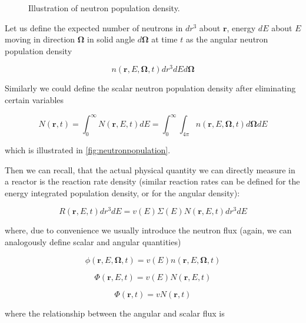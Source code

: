 \begin{figure}[ht!]
\protect {}\protect
\caption{\label{fig:neutronpopulation} \footnotesize{Illustration of neutron population density.}}
\end{figure} 

Let us define the expected number of neutrons in $dr^3$ about $\mathbf{r}$, energy $dE$ about $E$ moving in direction $\mathbf{\Omega}$ in solid angle $d\mathbf{\Omega}$ at time $t$ as the angular neutron population density

\begin{equation}
n(\mathbf{r},E,\mathbf{\Omega},t)dr^3dEd\mathbf{\Omega}
\end{equation}

\noindent Similarly we could define the scalar neutron population density after eliminating certain variables 

$$N(\mathbf{r},t)=\int^\infty_0N(\mathbf{r},E,t)dE=\int^\infty_0\int_{4\pi}n(\mathbf{r},E,\mathbf{\Omega},t)d\mathbf{\Omega}dE$$

\noindent which is illustrated in \autoref{fig:neutronpopulation}.

Then we can recall, that the actual physical quantity we can directly measure in a reactor is the reaction rate density (similar reaction rates can be defined for the energy integrated population density, or for the angular density):

\begin{equation}
R(\mathbf{r},E,t)dr^3dE=v(E)\Sigma(E) N(\mathbf{r},E,t)dr^3dE
\end{equation}

\noindent where, due to convenience we usually introduce the neutron flux (again, we can analogously define scalar and angular quantities)

\begin{equation}
\phi(\mathbf{r},E,\mathbf{\Omega},t)=v(E)n(\mathbf{r},E,\mathbf{\Omega},t)
\end{equation}

\begin{equation*}
\Phi(\mathbf{r},E,t)=v(E)N(\mathbf{r},E,t)
\end{equation*}

\begin{equation*}
\Phi(\mathbf{r},t)=vN(\mathbf{r},t)
\end{equation*}

\noindent where the relationship between the angular and scalar flux is

